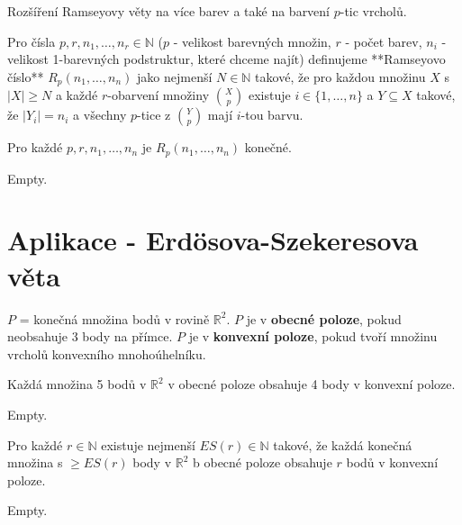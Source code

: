 Rozšíření Ramseyovy věty na více barev a také na barvení $p$-tic vrcholů.

\begin{definice}
	Pro čísla $p,r,n_{1}, \dots , n_{r} \in \mathbb{N}$ ($p$ - velikost barevných množin, $r$ - počet barev, $n_{i}$ - velikost 1-barevných podstruktur, které chceme najít) definujeme **Ramseyovo číslo** $R_{p}(n_{1}, \dots , n_{n})$ jako nejmenší $N \in \mathbb{N}$ takové, že pro každou množinu $X$ s $|X| \geq N$ a každé $r$-obarvení množiny $\binom{X}{p}$ existuje $i \in \{ 1, \dots , n \}$ a $Y \subseteq X$ takové, že $|Y_{i}| = n_{i}$ a všechny $p$-tice z $\binom{Y}{p}$ mají $i$-tou barvu.
\end{definice}

\begin{veta}
	Pro každé $p,r,n_{1}, \dots , n_{n}$ je $R_{p}(n_{1}, \dots , n_{n})$ konečné.
\end{veta}

\begin{dukaz}
	Empty.
\end{dukaz}

\section{Aplikace - Erdösova-Szekeresova věta}

\begin{definice}
	$P$ = konečná množina bodů v rovině $\mathbb{R}^{2}$. $P$ je v \textbf{obecné poloze}, pokud neobsahuje 3 body na přímce. $P$ je v \textbf{konvexní poloze}, pokud tvoří množinu vrcholů konvexního mnohoúhelníku.
\end{definice}

\begin{lemma}
	Každá množina 5 bodů v $\mathbb{R}^{2}$ v obecné poloze obsahuje 4 body v konvexní poloze.
\end{lemma}

\begin{dukaz}
	Empty.
\end{dukaz}

\begin{veta}
	Pro každé $r \in \mathbb{N}$ existuje nejmenší $ES(r) \in \mathbb{N}$ takové, že každá konečná množina s $\geq ES(r)$ body v $\mathbb{R}^{2}$ b obecné poloze obsahuje $r$ bodů v konvexní poloze.
\end{veta}

\begin{dukaz}
	Empty.
\end{dukaz}

